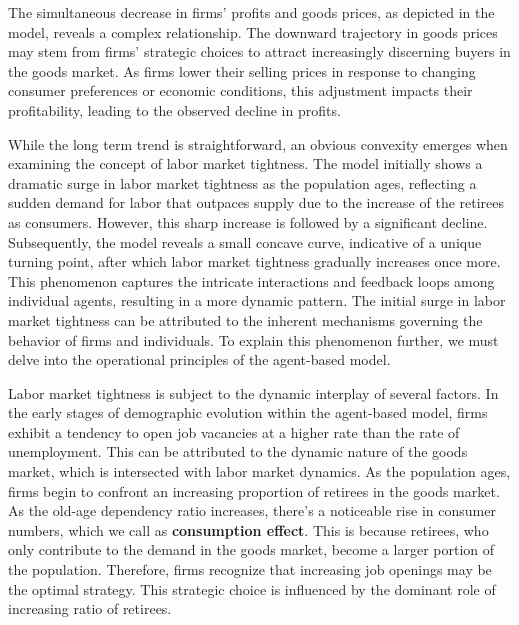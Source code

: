 \documentclass[ %
    final,
    scrbook,
    listoffigures,
    listoftables, 
    glossary]{cu-thesis}
\begin{document}
The simultaneous decrease in firms' profits and goods prices, as depicted in the model, reveals a complex relationship. The downward trajectory in goods prices may stem from firms' strategic choices to attract increasingly discerning buyers in the goods market. As firms lower their selling prices in response to changing consumer preferences or economic conditions, this adjustment impacts their profitability, leading to the observed decline in profits.

While the long term trend is straightforward, an obvious convexity emerges when examining the concept of labor market tightness. The model initially shows a dramatic surge in labor market tightness as the population ages, reflecting a sudden demand for labor that outpaces supply due to the increase of the retirees as consumers. However, this sharp increase is followed by a significant decline. Subsequently, the model reveals a small concave curve, indicative of a unique turning point, after which labor market tightness gradually increases once more. This phenomenon captures the intricate interactions and feedback loops among individual agents, resulting in a more dynamic pattern. 
The initial surge in labor market tightness can be attributed to the inherent mechanisms governing the behavior of firms and individuals. To explain this phenomenon further, we must delve into the operational principles of the agent-based model.

Labor market tightness is subject to the dynamic interplay of several factors. In the early stages of demographic evolution within the agent-based model, firms exhibit a tendency to open job vacancies at a higher rate than the rate of unemployment. This can be attributed to the dynamic nature of the goods market, which is intersected with labor market dynamics. As the population ages, firms begin to confront an increasing proportion of retirees in the goods market.
As the old-age dependency ratio increases, there's a noticeable rise in consumer numbers, which we call as \textbf{consumption effect}. This is because retirees, who only contribute to the demand in the goods market, become a larger portion of the population.
Therefore, firms recognize that increasing job openings may be the optimal strategy. This strategic choice is influenced by the dominant role of increasing ratio of retirees. 
\end{document}

